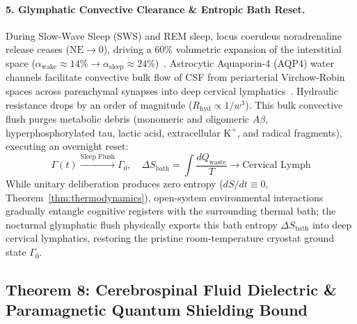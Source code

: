 \documentclass[10pt,twocolumn,3p]{article}
\begin{document}
\paragraph{5. Glymphatic Convective Clearance \& Entropic Bath Reset.}
During Slow-Wave Sleep (SWS) and REM sleep, locus coeruleus noradrenaline release ceases ($\text{NE} \to 0$), driving a $60\%$ volumetric expansion of the interstitial space ($\alpha_{\text{wake}} \approx 14\% \to \alpha_{\text{sleep}} \approx 24\%$)~\cite{xie2013}. Astrocytic Aquaporin-4 (AQP4) water channels facilitate convective bulk flow of CSF from periarterial Virchow-Robin spaces across parenchymal synapses into deep cervical lymphatics~\cite{iliff2012,nedergaard2013,jessen2015}. Hydraulic resistance drops by an order of magnitude ($R_{\text{hyd}} \propto 1/w^3$). This bulk convective flush purges metabolic debris (monomeric and oligomeric $A\beta$, hyperphosphorylated tau, lactic acid, extracellular $\text{K}^+$, and radical fragments), executing an overnight reset:
\begin{equation}
    \Gamma(t) \xrightarrow{\text{Sleep Flush}} \Gamma_0, \quad \Delta S_{\text{bath}} = \int \frac{dQ_{\text{waste}}}{T} \to \text{Cervical Lymph}
    \label{eq:glymphatic_reset}
\end{equation}
While unitary deliberation produces zero entropy ($dS/dt \equiv 0$, Theorem~\ref{thm:thermodynamics}), open-system environmental interactions gradually entangle cognitive registers with the surrounding thermal bath; the nocturnal glymphatic flush physically exports this bath entropy $\Delta S_{\text{bath}}$ into deep cervical lymphatics, restoring the pristine room-temperature cryostat ground state $\Gamma_0$.

\subsection{Theorem 8: Cerebrospinal Fluid Dielectric \& Paramagnetic Quantum Shielding Bound}
\label{subsec:theorem8}
\end{document}
